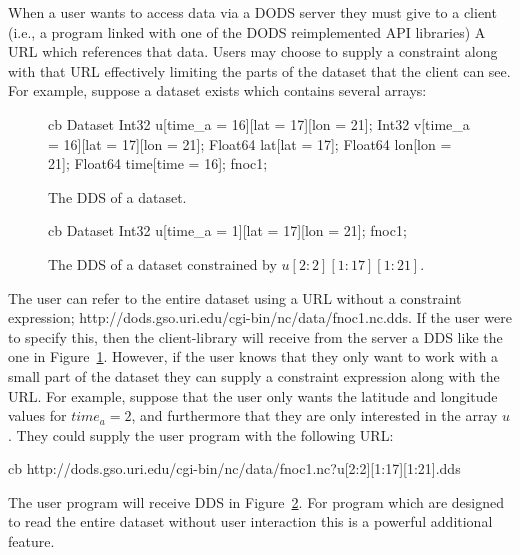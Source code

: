When a user wants to access data via a DODS server they must give to a client
(i.e., a program linked with one of the DODS reimplemented API libraries) A
URL which references that data. Users may choose to supply a constraint along
with that URL effectively limiting the parts of the dataset that the client
can see. For example, suppose a dataset exists which contains several
arrays:

\begin{figure}
\begin{code}{cb}
    Dataset {
        Int32 u[time_a = 16][lat = 17][lon = 21];
        Int32 v[time_a = 16][lat = 17][lon = 21];
        Float64 lat[lat = 17];
        Float64 lon[lon = 21];
        Float64 time[time = 16];
    } fnoc1;
\end{code}
\caption{The DDS of a dataset.}
\label{url:fig:dds}
\end{figure}

\begin{figure}
\begin{code}{cb}
    Dataset {
        Int32 u[time_a = 1][lat = 17][lon = 21];
    } fnoc1;
\end{code}
\caption{The DDS of a dataset constrained by $u[2:2][1:17][1:21]$.}
\label{url:fig:dds2}
\end{figure}

The user can refer to the entire dataset using a URL without a constraint
expression;
{http://dods.gso.uri.edu/cgi-bin/nc/data/fnoc1.nc.dds}. If the user were to
specify this, then the client-library will receive from the server a DDS like
the one in Figure~\ref{url:fig:dds}. However, if the user knows that they
only want to work with a small part of the dataset they can supply a
constraint expression along with the URL\@. For example, suppose that the
user only wants the latitude and longitude values for $time_a = 2$, and
furthermore that they are only interested in the array $u$. They could supply
the user program with the following URL:

\begin{code}{cb}
{http://dods.gso.uri.edu/cgi-bin/nc/data/fnoc1.nc?u[2:2][1:17][1:21].dds}
\end{code}

\noindent The user program will receive DDS in
Figure~\ref{url:fig:dds2}. For program which are designed to read the
entire dataset without user interaction this is a powerful additional
feature.

